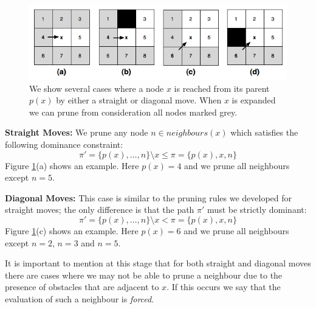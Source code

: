 \begin{figure}[h]
       \begin{center}
		   \includegraphics[scale=0.4, trim = 10mm 10mm 10mm 0mm]{diagrams/pruningrules.png}
       \end{center}
	\vspace{-3pt}
       \caption{We show several cases where a node $x$ is reached from its
parent $p(x)$ by either a straight or diagonal move. When $x$ is expanded we can
prune from consideration all nodes marked grey.}
       \label{fig:pruning}
\end{figure}
\par \noindent
\textbf{Straight Moves:} We prune any node $n \in neighbours(x)$ which 
satisfies the following dominance constraint:
\begin{equation}
\pi' = \lbrace p(x), \ldots, n \rbrace \setminus x  
\leq \pi = \lbrace p(x), x, n \rbrace
\end{equation}
Figure \ref{fig:pruning}(a) shows an example. Here $p(x) = 4$ and we prune
 all neighbours except $n = 5$.
\par \noindent
\textbf{Diagonal Moves:} This case is similar to the pruning rules we developed
for straight moves; the only difference is that the path $\pi'$ must be strictly
dominant: 
\begin{equation}
\pi' = \lbrace p(x), \ldots, n \rbrace \setminus x  
< \pi = \lbrace p(x), x, n \rbrace
\end{equation}
Figure \ref{fig:pruning}(c) shows an example. Here $p(x) = 6$ and we prune all
neighbours except $n = 2$, $n = 3$ and $n = 5$.  
\par
It is important to mention at this stage that for both straight and diagonal moves
there are cases where we may not be able to prune a neighbour due to the
presence of obstacles that are adjacent to $x$.  If this occurs we say that the
evaluation of such a neighbour is \emph{forced}.

